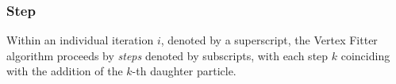 %
%

%
%
%

\subsubsection{Step}
Within an individual iteration $i$, denoted by a superscript, the Vertex Fitter algorithm proceeds by \textit{steps} denoted by subscripts, with each step $k$ coinciding with the addition of the $k$-th daughter particle.

